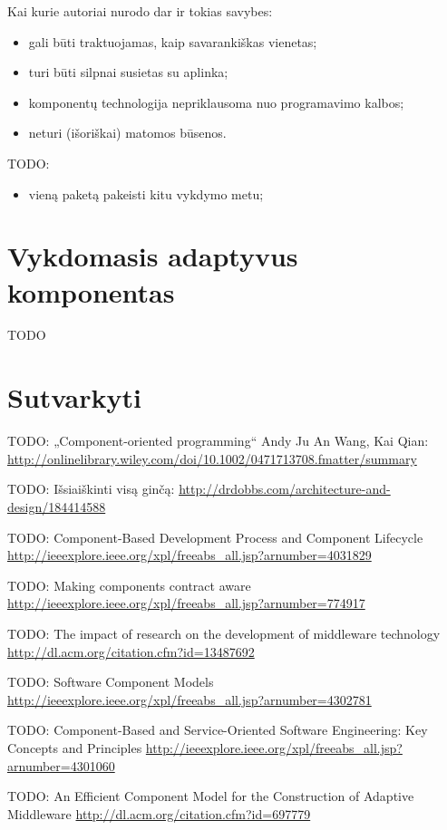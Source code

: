 Kai kurie autoriai nurodo dar ir tokias savybes:
\begin{itemize}
  \item gali būti traktuojamas, kaip savarankiškas vienetas;
  \item turi būti silpnai susietas su aplinka;
  \item komponentų technologija nepriklausoma nuo programavimo kalbos;
  \item neturi (išoriškai) matomos būsenos.
\end{itemize}

TODO:
\begin{itemize}
  \item vieną paketą pakeisti kitu vykdymo metu;
\end{itemize}

\section{Vykdomasis adaptyvus komponentas}

TODO

\section{Sutvarkyti}

TODO: „Component-oriented programming“ Andy Ju An Wang, Kai Qian:
\url{http://onlinelibrary.wiley.com/doi/10.1002/0471713708.fmatter/summary}

TODO: Išsiaiškinti visą ginčą:
\url{http://drdobbs.com/architecture-and-design/184414588}
\cite{what-to-compose}

TODO: Component-Based Development Process and Component Lifecycle
\url{http://ieeexplore.ieee.org/xpl/freeabs_all.jsp?arnumber=4031829}

TODO: Making components contract aware
\url{http://ieeexplore.ieee.org/xpl/freeabs_all.jsp?arnumber=774917}

TODO: The impact of research on the development of middleware technology
\url{http://dl.acm.org/citation.cfm?id=13487692}

TODO: Software Component Models
\url{http://ieeexplore.ieee.org/xpl/freeabs_all.jsp?arnumber=4302781}

TODO: Component-Based and Service-Oriented Software Engineering: Key Concepts and Principles 
\url{http://ieeexplore.ieee.org/xpl/freeabs_all.jsp?arnumber=4301060}

TODO: An Efficient Component Model for the Construction of Adaptive Middleware
\url{http://dl.acm.org/citation.cfm?id=697779}

